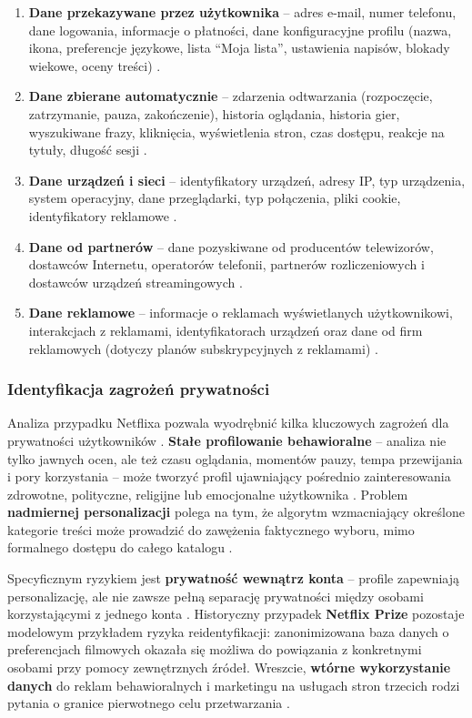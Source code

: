 \documentclass[12pt, a4paper]{article}
\begin{document}
\begin{enumerate}
  \item \textbf{Dane przekazywane przez użytkownika} -- adres e-mail, numer telefonu, dane logowania, informacje o płatności, dane konfiguracyjne profilu (nazwa, ikona, preferencje językowe, lista ``Moja lista'', ustawienia napisów, blokady wiekowe, oceny treści) \cite{netflix_privacy}.
  \item \textbf{Dane zbierane automatycznie} -- zdarzenia odtwarzania (rozpoczęcie, zatrzymanie, pauza, zakończenie), historia oglądania, historia gier, wyszukiwane frazy, kliknięcia, wyświetlenia stron, czas dostępu, reakcje na tytuły, długość sesji \cite{netflix_data, netflix_recs}.
  \item \textbf{Dane urządzeń i sieci} -- identyfikatory urządzeń, adresy IP, typ urządzenia, system operacyjny, dane przeglądarki, typ połączenia, pliki cookie, identyfikatory reklamowe \cite{netflix_privacy}.
  \item \textbf{Dane od partnerów} -- dane pozyskiwane od producentów telewizorów, dostawców Internetu, operatorów telefonii, partnerów rozliczeniowych i dostawców urządzeń streamingowych \cite{netflix_privacy}.
  \item \textbf{Dane reklamowe} -- informacje o reklamach wyświetlanych użytkownikowi, interakcjach z reklamami, identyfikatorach urządzeń oraz dane od firm reklamowych (dotyczy planów subskrypcyjnych z reklamami) \cite{netflix_privacy}.
\end{enumerate}

\subsubsection{Identyfikacja zagrożeń prywatności}

Analiza przypadku Netflixa pozwala wyodrębnić kilka kluczowych zagrożeń dla prywatności użytkowników \cite{netflix_privacy, netflix_data}. \textbf{Stałe profilowanie behawioralne} -- analiza nie tylko jawnych ocen, ale też czasu oglądania, momentów pauzy, tempa przewijania i pory korzystania -- może tworzyć profil ujawniający pośrednio zainteresowania zdrowotne, polityczne, religijne lub emocjonalne użytkownika \cite{chen2025}. Problem \textbf{nadmiernej personalizacji} polega na tym, że algorytm wzmacniający określone kategorie treści może prowadzić do zawężenia faktycznego wyboru, mimo formalnego dostępu do całego katalogu \cite{netflix_recs, netflix_research}.

Specyficznym ryzykiem jest \textbf{prywatność wewnątrz konta} -- profile zapewniają personalizację, ale nie zawsze pełną separację prywatności między osobami korzystającymi z jednego konta \cite{netflix_transfer}. Historyczny przypadek \textbf{Netflix Prize} \cite{narayanan2008} pozostaje modelowym przykładem ryzyka reidentyfikacji: zanonimizowana baza danych o preferencjach filmowych okazała się możliwa do powiązania z konkretnymi osobami przy pomocy zewnętrznych źródeł. Wreszcie, \textbf{wtórne wykorzystanie danych} do reklam behawioralnych i marketingu na usługach stron trzecich rodzi pytania o granice pierwotnego celu przetwarzania \cite{netflix_privacy, rodo}.
\end{document}
